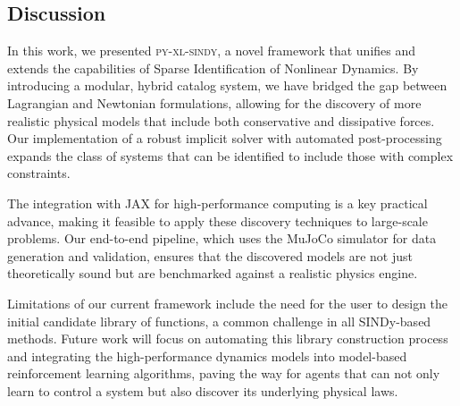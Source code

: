 \documentclass[12pt]{article}
\newcommand{\frameworkname}{\textsc{py-xl-sindy}}
\begin{document}
\subsection*{Discussion}
In this work, we presented \frameworkname, a novel framework that unifies and extends the capabilities of Sparse Identification of Nonlinear Dynamics. By introducing a modular, hybrid catalog system, we have bridged the gap between Lagrangian and Newtonian formulations, allowing for the discovery of more realistic physical models that include both conservative and dissipative forces. Our implementation of a robust implicit solver with automated post-processing expands the class of systems that can be identified to include those with complex constraints.

The integration with JAX for high-performance computing is a key practical advance, making it feasible to apply these discovery techniques to large-scale problems. Our end-to-end pipeline, which uses the MuJoCo simulator for data generation and validation, ensures that the discovered models are not just theoretically sound but are benchmarked against a realistic physics engine.

Limitations of our current framework include the need for the user to design the initial candidate library of functions, a common challenge in all SINDy-based methods. Future work will focus on automating this library construction process and integrating the high-performance dynamics models into model-based reinforcement learning algorithms, paving the way for agents that can not only learn to control a system but also discover its underlying physical laws.

\newpage

\end{document}
